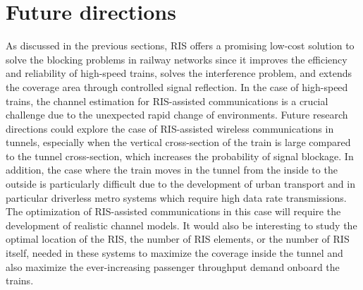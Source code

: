 \documentclass[conference]{IEEEtran}
\begin{document}



\section{Future directions}
\label{sec:future}
As discussed in the previous sections, RIS offers a promising low-cost solution to solve the blocking problems in railway networks since it improves the efficiency and reliability of high-speed trains, solves the interference problem, and extends the coverage area through controlled signal reflection. In the case of high-speed trains, the channel estimation for RIS-assisted communications is a crucial challenge due to the unexpected rapid change of environments. Future research directions could explore the case of RIS-assisted wireless communications in tunnels, especially when the vertical cross-section of the train is large compared to the tunnel cross-section, which increases the probability of signal blockage. In addition, the case where the train moves in the tunnel from the inside to the outside is particularly difficult due to the development of urban transport and in particular driverless metro systems which require high data rate transmissions. The optimization of RIS-assisted communications in this case will require the development of realistic channel models. It would also be interesting to study the optimal location of the RIS, the number of RIS elements, or the number of RIS itself, needed in these systems to maximize the coverage inside the tunnel and also maximize the ever-increasing passenger throughput demand onboard the trains.
\end{document}
